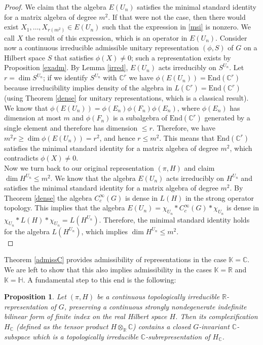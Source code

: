 \documentclass{article}
\theoremstyle{definition}
\theoremstyle{remark}
\theoremstyle{plain}
\newtheorem{prp}[dfn]{Proposition}
\begin{document}
\begin{proof}
    We claim that the algebra $E(U_n)$ satisfies the minimal standard identity for a matrix algebra of degree $m^2$. If that were not the case, then there would exist $X_1,\ldots,X_{r(m^2)}\in E(U_n)$ such that the expression in \eqref{msi} is nonzero. We call $X$ the result of this expression, which is an operator in $E(U_n)$. Consider now a continuous irreducible admissible unitary representation $(\phi,S)$ of $G$ on a Hilbert space $S$ that satisfies $\phi(X)\neq 0$; such a representation exists by Proposition \ref{exadm}. By Lemma \ref{irred}, $E(U_n)$ acts irreducibly on $S^{U_n}$. Let $r=\dim{S^{U_n}}$; if we identify $S^{U_n}$ with $\mathbb{C}^r$ we have $\phi(E(U_n))=\mathrm{End}(\mathbb{C}^r)$ because irreducibility implies density of the algebra in $L(\mathbb{C}^r)=\mathrm{End}(\mathbb{C}^r)$ (using Theorem \ref{dense} for unitary representations, which is a classical result). We know that $\phi(E(U_n))=\phi(E_n)\phi(F_n)\phi(E_n)$, where $\phi(E_n)$ has dimension at most $m$ and $\phi(F_n)$ is a subalgebra of $\mathrm{End}(\mathbb{C}^r)$ generated by a single element and therefore has dimension $\leq r$. Therefore, we have $m^2 r\geq\dim{\phi(E(U_n))}=r^2$, and hence $r\leq m^2$. This means that $\mathrm{End}(\mathbb{C}^r)$ satisfies the minimal standard identity for a matrix algebra of degree $m^2$, which contradicts $\phi(X)\neq 0$. \\

    Now we turn back to our original representation $(\pi,H)$ and claim $\dim{H^{U_n}}\leq m^2$. We know that the algebra $E(U_n)$ acts irreducibly on $H^{U_n}$ and satisfies the minimal standard identity for a matrix algebra of degree $m^2$. By Theorem \ref{dense} the algebra $C_c^\infty(G)$ is dense in $L(H)$ in the strong operator topology. This implies that the algebra $E(U_n)=\chi_{U_n} * C_c^\infty(G) * \chi_{U_n}$ is dense in $\chi_{U_n} * L(H) * \chi_{U_n}=L(H^{U_n})$. Therefore, the minimal standard identity holds for the algebra $L(H^{U_n})$, which implies $\dim{H^{U_n}}\leq m^2$. \\
\end{proof}

Theorem \ref{admissC} provides admissibility of representations in the case $\mathbb{K}=\mathbb{C}$. We are left to show that this also implies admissibility in the cases $\mathbb{K}=\mathbb{R}$ and $\mathbb{K}=\mathbb{H}$. A fundamental step to this end is the following:

\begin{prp} \label{subirredC}
    Let $(\pi,H)$ be a continuous topologically irreducible $\mathbb{R}$-representation of $G$, preserving a continuous strongly nondegenerate indefinite bilinear form of finite index on the real Hilbert space $H$. Then its complexification $H_{\mathbb{C}}$ (defined as the tensor product $H\otimes_{\mathbb{R}}\mathbb{C}$) contains a closed $G$-invariant $\mathbb{C}$-subspace which is a topologically irreducible $\mathbb{C}$-subrepresentation of $H_{\mathbb{C}}$.
\end{prp}
\end{document}
